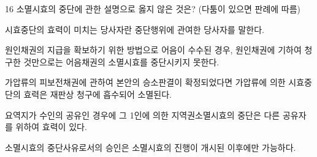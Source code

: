 \begin{question}{16}
소멸시효의 중단에 관한 설명으로 옳지 않은 것은? (다툼이 있으면 판례에 따름)
\begin{choices}
  \item 시효중단의 효력이 미치는 당사자란 중단행위에 관여한 당사자를 말한다.
  \item 원인채권의 지급을 확보하기 위한 방법으로 어음이 수수된 경우, 원인채권에 기하여 청구한 것만으로는 어음채권의 소멸시효를 중단시키지 못한다.
  \item 가압류의 피보전채권에 관하여 본안의 승소판결이 확정되었다면 가압류에 의한 시효중단의 효력은 재판상 청구에 흡수되어 소멸된다.
  \item 요역지가 수인의 공유인 경우에 그 1인에 의한 지역권소멸시효의 중단은 다른 공유자를 위하여 효력이 있다.
  \item 소멸시효의 중단사유로서의 승인은 소멸시효의 진행이 개시된 이후에만 가능하다.
\end{choices}
\end{question}
